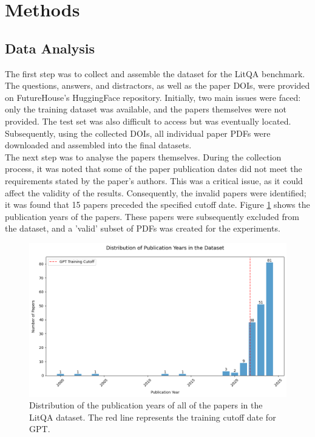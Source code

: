 \section{Methods}
\label{sec:methods}

\subsection{Data Analysis}
The first step was to collect and assemble the dataset for the LitQA benchmark. 
The questions, answers, and distractors, as well as the paper DOIs, were provided on FutureHouse's HuggingFace repository. 
Initially, two main issues were faced: only the training dataset was available, and the papers themselves were not provided. The test set was also difficult to access but was eventually located. Subsequently, using the collected DOIs, all individual paper PDFs were downloaded and assembled into the final datasets. \\

The next step was to analyse the papers themselves. During the collection process, it was noted that some of the paper publication dates did not meet the requirements stated by the paper's authors. This was a critical issue, as it could affect the validity of the results. Consequently, the invalid papers were identified; it was found that 15 papers preceded the specified cutoff date. Figure \ref{fig:paper-years} shows the publication years of the papers. These papers were subsequently excluded from the dataset, and a 'valid' subset of PDFs was created for the experiments. \\

\begin{figure}[H]
    \centering
    \includegraphics[width=\textwidth]{figures/paper_years.png}
    \caption{Distribution of the publication years of all of the papers in the LitQA dataset. The red line represents the training cutoff date for GPT.}
    \label{fig:paper-years}
\end{figure}

